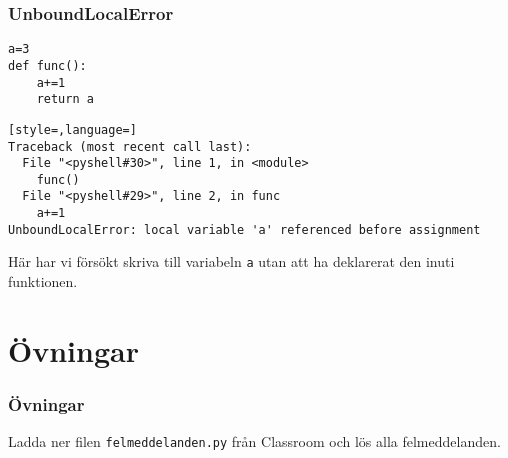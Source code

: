 \documentclass[aspectratio=169]{beamer}
\begin{document}
\begin{frame}[fragile]
\frametitle{UnboundLocalError}

\begin{lstlisting}
a=3
def func():
    a+=1
    return a
\end{lstlisting}

\begin{lstlisting}[style=,language=]
Traceback (most recent call last):
  File "<pyshell#30>", line 1, in <module>
    func()
  File "<pyshell#29>", line 2, in func
    a+=1
UnboundLocalError: local variable 'a' referenced before assignment
\end{lstlisting}

Här har vi försökt skriva till variabeln \texttt{a} utan att ha deklarerat den inuti funktionen.

\end{frame}

\section{Övningar}

\begin{frame}
	\frametitle{Övningar}
	
	Ladda ner filen \texttt{felmeddelanden.py} från Classroom och lös alla felmeddelanden.
	
	
\end{frame}
\end{document}
